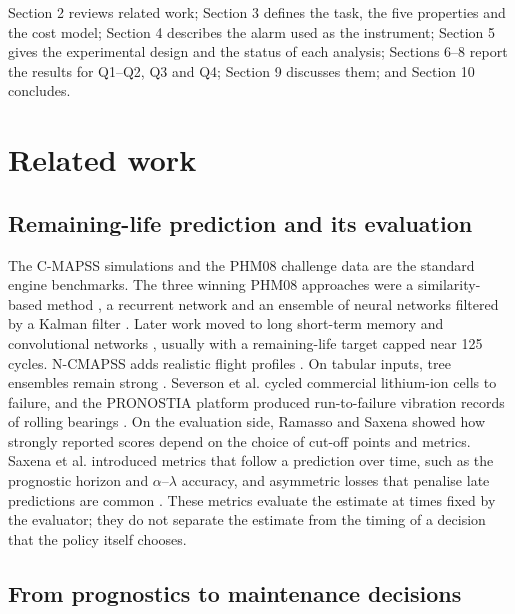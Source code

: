 \documentclass[a4paper,fleqn,doubleblind]{cas-dc}
\begin{document}
Section 2 reviews related work; Section 3 defines the task, the five properties and the cost model; Section 4 describes the alarm used as the instrument; Section 5 gives the experimental design and the status of each analysis; Sections 6--8 report the results for Q1--Q2, Q3 and Q4; Section 9 discusses them; and Section 10 concludes.

\section{Related work}\label{sec:2}

\subsection{Remaining-life prediction and its evaluation}

The C-MAPSS simulations and the PHM08 challenge data \cite{saxena2008} are the standard engine benchmarks. The three winning PHM08 approaches were a similarity-based method \cite{wang2008}, a recurrent network \cite{heimes2008} and an ensemble of neural networks filtered by a Kalman filter \cite{peel2008}. Later work moved to long short-term memory \cite{zheng2017} and convolutional networks \cite{li2018}, usually with a remaining-life target capped near 125 cycles. N-CMAPSS adds realistic flight profiles \cite{ariaschao2021}. On tabular inputs, tree ensembles remain strong \cite{grinsztajn2022,friedman2001}. Severson et al. \cite{severson2019} cycled commercial lithium-ion cells to failure, and the PRONOSTIA platform produced run-to-failure vibration records of rolling bearings \cite{nectoux2012}. On the evaluation side, Ramasso and Saxena \cite{ramasso2014} showed how strongly reported scores depend on the choice of cut-off points and metrics. Saxena et al. \cite{saxena2010} introduced metrics that follow a prediction over time, such as the prognostic horizon and $\alpha$--$\lambda$ accuracy, and asymmetric losses that penalise late predictions are common \cite{rengasamy2020}. These metrics evaluate the estimate at times fixed by the evaluator; they do not separate the estimate from the timing of a decision that the policy itself chooses.

\subsection{From prognostics to maintenance decisions}
\end{document}
